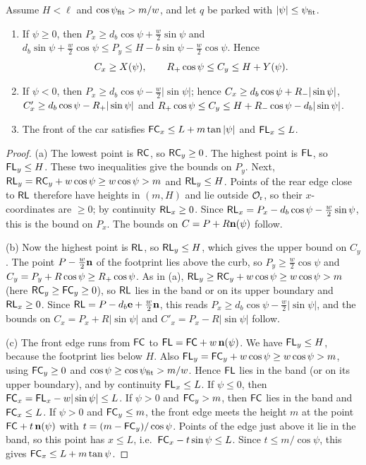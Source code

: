 \begin{lemma}\label{lem:parked}
Assume $H<\ell$ and $\cos\psi_{\rm fit}>m/w$, and let $q$ be parked with $|\psi|\le\psi_{\rm fit}$.
\begin{enumerate}[label=(\alph*)]
\item If $\psi\ge0$, then $P_x\ge d_b\cos\psi+\tfrac w2\sin\psi$ and $d_b\sin\psi+\tfrac w2\cos\psi\le P_y\le H-b\sin\psi-\tfrac w2\cos\psi$.
Hence
\[
  C_x\ge X(\psi),\qquad R_{+}\cos\psi\le C_y\le H+Y(\psi).
\]
\item If $\psi<0$, then $P_x\ge d_b\cos\psi-\tfrac w2|\sin\psi|$; hence $C_x\ge d_b\cos\psi+R_{-}|\sin\psi|$, $C'_x\ge d_b\cos\psi-R_{+}|\sin\psi|$ and $R_{+}\cos\psi\le C_y\le H+R_{-}\cos\psi-d_b|\sin\psi|$.
\item The front of the car satisfies $\mathsf{FC}_x\le L+m\tan|\psi|$ and $\mathsf{FL}_x\le L$.
\end{enumerate}
\end{lemma}
\begin{proof}
(a) The lowest point is $\mathsf{RC}$, so $\mathsf{RC}_y\ge0$.
The highest point is $\mathsf{FL}$, so $\mathsf{FL}_y\le H$.
These two inequalities give the bounds on $P_y$.
Next, $\mathsf{RL}_y=\mathsf{RC}_y+w\cos\psi\ge w\cos\psi>m$ and $\mathsf{RL}_y\le H$.
Points of the rear edge close to $\mathsf{RL}$ therefore have heights in $(m,H)$ and lie outside $\mathcal{O}_{\mathrm r}$, so their $x$-coordinates are $\ge0$; by continuity $\mathsf{RL}_x\ge0$.
Since $\mathsf{RL}_x=P_x-d_b\cos\psi-\tfrac w2\sin\psi$, this is the bound on $P_x$.
The bounds on $C=P+R\mathbf{n}(\psi)$ follow.

(b) Now the highest point is $\mathsf{RL}$, so $\mathsf{RL}_y\le H$, which gives the upper bound on $C_y$.
The point $P-\tfrac w2\mathbf{n}$ of the footprint lies above the curb, so $P_y\ge\tfrac w2\cos\psi$ and $C_y=P_y+R\cos\psi\ge R_{+}\cos\psi$.
As in (a), $\mathsf{RL}_y\ge\mathsf{RC}_y+w\cos\psi\ge w\cos\psi>m$ (here $\mathsf{RC}_y\ge\mathsf{FC}_y\ge0$), so $\mathsf{RL}$ lies in the band or on its upper boundary and $\mathsf{RL}_x\ge0$.
Since $\mathsf{RL}=P-d_b\mathbf{e}+\tfrac w2\mathbf{n}$, this reads $P_x\ge d_b\cos\psi-\tfrac w2|\sin\psi|$, and the bounds on $C_x=P_x+R|\sin\psi|$ and $C'_x=P_x-R|\sin\psi|$ follow.

(c) The front edge runs from $\mathsf{FC}$ to $\mathsf{FL}=\mathsf{FC}+w\,\mathbf{n}(\psi)$.
We have $\mathsf{FL}_y\le H$, because the footprint lies below $H$.
Also $\mathsf{FL}_y=\mathsf{FC}_y+w\cos\psi\ge w\cos\psi>m$, using $\mathsf{FC}_y\ge0$ and $\cos\psi\ge\cos\psi_{\rm fit}>m/w$.
Hence $\mathsf{FL}$ lies in the band (or on its upper boundary), and by continuity $\mathsf{FL}_x\le L$.
If $\psi\le0$, then $\mathsf{FC}_x=\mathsf{FL}_x-w|\sin\psi|\le L$.
If $\psi>0$ and $\mathsf{FC}_y>m$, then $\mathsf{FC}$ lies in the band and $\mathsf{FC}_x\le L$.
If $\psi>0$ and $\mathsf{FC}_y\le m$, the front edge meets the height $m$ at the point $\mathsf{FC}+t\,\mathbf{n}(\psi)$ with $t=(m-\mathsf{FC}_y)/\cos\psi$.
Points of the edge just above it lie in the band, so this point has $x\le L$, i.e.\ $\mathsf{FC}_x-t\sin\psi\le L$.
Since $t\le m/\cos\psi$, this gives $\mathsf{FC}_x\le L+m\tan\psi$.
\end{proof}
